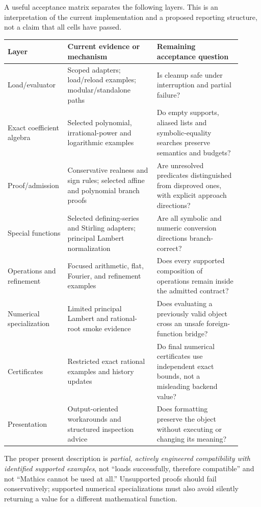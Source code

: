 \documentclass[11pt,letterpaper]{article}
\begin{document}
A useful acceptance matrix separates the following layers. This is an interpretation of the current implementation and a proposed reporting structure, not a claim that all cells have passed.

\begin{longtable}{@{}P{0.19\linewidth}P{0.37\linewidth}P{0.35\linewidth}@{}}
\toprule
Layer & Current evidence or mechanism & Remaining acceptance question\\
\midrule\endhead
Load/evaluator & Scoped adapters; load/reload examples; modular/standalone paths & Is cleanup safe under interruption and partial failure?\\[4pt]
Exact coefficient algebra & Selected polynomial, irrational-power and logarithmic examples & Do empty supports, aliased lists and symbolic-equality searches preserve semantics and budgets?\\[4pt]
Proof/admission & Conservative realness and sign rules; selected affine and polynomial branch proofs & Are unresolved predicates distinguished from disproved ones, with explicit approach directions?\\[4pt]
Special functions & Selected defining-series and Stirling adapters; principal Lambert normalization & Are all symbolic and numeric conversion directions branch-correct?\\[4pt]
Operations and refinement & Focused arithmetic, flat, Fourier, and refinement examples & Does every supported composition of operations remain inside the admitted contract?\\[4pt]
Numerical specialization & Limited principal Lambert and rational-root smoke evidence & Does evaluating a previously valid object cross an unsafe foreign-function bridge?\\[4pt]
Certificates & Restricted exact rational examples and history updates & Do final numerical certificates use independent exact bounds, not a misleading backend value?\\[4pt]
Presentation & Output-oriented workarounds and structured inspection advice & Does formatting preserve the object without executing or changing its meaning?\\
\bottomrule
\end{longtable}

The proper present description is \emph{partial, actively engineered compatibility with identified supported examples}, not ``loads successfully, therefore compatible'' and not ``Mathics cannot be used at all.'' Unsupported proofs should fail conservatively; supported numerical specializations must also avoid silently returning a value for a different mathematical function.
\end{document}
